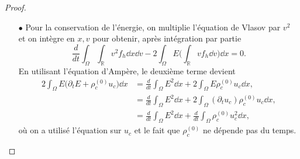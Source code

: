 \begin{proof}
\begin{enumerate}

    \item[$\bullet$] Pour la conservation de l'énergie, on multiplie l'équation de Vlasov par $v^2$ et on intègre en $x,v$ pour obtenir, après intégration par partie
      $$  
        \frac{d}{dt} \int_\Omega\int_{\mathbb{R}} v^2 f_h \dd{x} \dd{v} - 2 \int_\Omega E \Big(\int_{\mathbb{R}} v f_h \dd{v}\Big)\dd{x} = 0.
      $$
      En utilisant l'équation d'Ampère, le deuxième terme devient 
      $$
        \begin{aligned}
          2 \int_\Omega E \Big( \partial_t E + \rho^{(0)}_c u_c\Big)\dd{x}
            &=  \frac{d}{dt} \int_\Omega E^2\dd{x}  +2 \int_\Omega E \rho^{(0)}_c u_c \dd{x}, \\
            &= \frac{d}{dt} \int_\Omega E^2\dd{x}  + 2\int_\Omega (\partial_t u_c ) \rho^{(0)}_c u_c \dd{x}, \\ 
            &= \frac{d}{dt} \int_\Omega E^2\dd{x}  + \frac{d}{dt} \int_\Omega \rho_c^{(0)} u_c^2 \dd{x}, 
        \end{aligned}
      $$
      où on a utilisé l'équation sur $u_c$ et le fait que $\rho_c^{(0)}$ ne dépende pas du temps. 
  \end{enumerate}
\end{proof}
